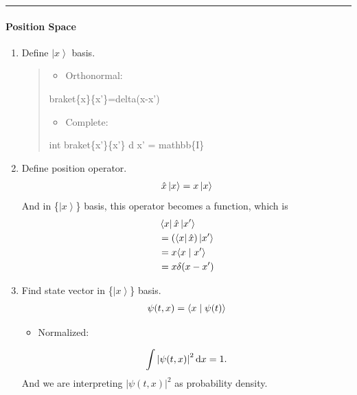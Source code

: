\documentclass[letterpaper,10pt,english]{sphinxmanual}
\def\d{{\rm d}}
\newcommand{\bra}[1]{\left\langle #1\right|}
\newcommand{\ket}[1]{\left| #1\right\rangle}
\newcommand{\braket}[2]{\langle #1 \mid #2 \rangle}
\begin{document}
\bigskip\hrule{}\bigskip



\paragraph{Position Space}
\label{Quantum/QuantumMechanics:position-space}\begin{enumerate}
\item {} 
Define \(\ket{x}\) basis.
\begin{quote}
\begin{itemize}
\item {} 
Orthonormal:

\end{itemize}

braket\{x\}\{x'\}=delta(x-x')
\begin{itemize}
\item {} 
Complete:

\end{itemize}

int braket\{x'\}\{x'\} d x' = mathbb\{I\}
\end{quote}

\item {} 
Define position operator.
\begin{gather}
\begin{split}\hat x \ket{x} = x \ket{x}\end{split}\notag
\end{gather}
And in \{\(\ket{x}\)\} basis, this operator becomes a function, which is
\begin{gather}
\begin{split}&\bra{x}\hat x \ket{x'}  \\
&= \left(\bra{x}\hat x\right)\ket{x'} \\
&= x \braket{x}{x'} \\
&= x \delta(x-x')\end{split}\notag
\end{gather}
\item {} 
Find state vector in \{\(\ket{x}\)\} basis.
\begin{gather}
\begin{split}\psi(t,x) = \braket{x}{\psi(t)}\end{split}\notag
\end{gather}\begin{itemize}
\item {} 
Normalized:

\end{itemize}
\begin{gather}
\begin{split}\int \left| \psi(t,x) \right|^2 \d x = 1.\end{split}\notag
\end{gather}
And we are interpreting \(\left| \psi(t, x)\right|^2\) as probability density.


\end{enumerate}
\end{document}

